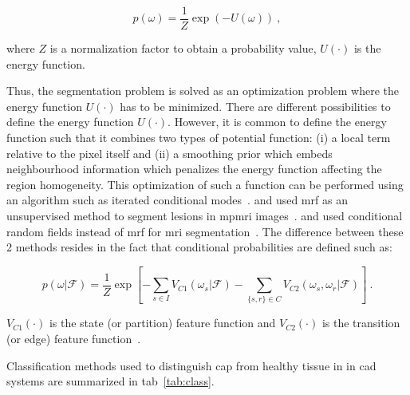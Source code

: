 \begin{enumerate}[leftmargin=*]
  \begin{equation}
    p(\omega) =  \frac{1}{Z} \exp\left( -U(\omega) \right)  \ ,
    \label{eq:mrf2}
  \end{equation}

  \noindent where $Z$ is a normalization factor to obtain a probability value,
  $U(\cdot)$ is the energy function.

  Thus, the segmentation problem is solved as an optimization problem where the
  energy function $U(\cdot)$ has to be minimized.
  There are different possibilities to define the energy function $U(\cdot)$.
  However, it is common to define the energy function such that it combines two
  types of potential function: (i) a local term relative to the pixel itself
  and (ii) a smoothing prior which embeds neighbourhood information which
  penalizes the energy function affecting the region homogeneity.
  This optimization of such a function can be performed using an algorithm such
  as iterated conditional modes~\cite{Kato2001}.
  \citeauthor{Liu2009} and \citeauthor{Ozer2010} used \ac{mrf} as an
  unsupervised method to segment lesions in \ac{mpmri}
  images~\cite{Liu2009,Ozer2010}.
  \citeauthor{Artan2010} and \citeauthor{chung2015prostate} used conditional
  random fields instead of \ac{mrf} for \ac{mri}
  segmentation~\cite{Artan2009,Artan2010,chung2015prostate}.
  The difference between these 2 methods resides in the fact that conditional
  probabilities are defined such as:

  \begin{equation}
    p(\omega|\mathcal{F}) =  \frac{1}{Z} \exp \left[ - \sum_{s \in I} V_{C1}(\omega_s|\mathcal{F}) - \sum_{\{s,r\} \in C } V_{C2} (\omega_s,\omega_r|\mathcal{F})  \right] \ .
    \label{eq:crf}
  \end{equation}

  \noindent $V_{C1}(\cdot)$ is the state (or partition) feature function and
  $V_{C2}(\cdot)$ is the transition (or edge) feature
  function~\cite{Kato2012}.

\end{enumerate}

Classification methods used to distinguish \ac{cap} from healthy tissue in in
\ac{cad} systems are summarized in \acs{tab}~\ref{tab:class}.

